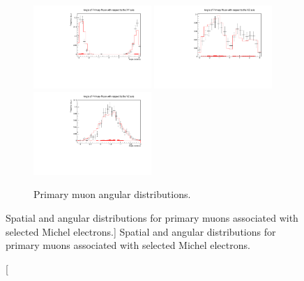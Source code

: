 \begin{figure}
	\begin{subfigure}[b]{\textwidth}
		\centering
		\vspace{1cm}
		\includegraphics[width=0.49\textwidth]{figures/DataVMC_angle_xy.pdf}
		\hfill
		\includegraphics[width=0.49\textwidth]{figures/DataVMC_angle_xz.pdf}
		\includegraphics[width=0.49\textwidth]{figures/DataVMC_angle_yz.pdf}
		\caption {Primary muon angular distributions.}
		\label{fig:muon_angles}
	\end{subfigure}
	

	\caption
	[Spatial and angular distributions for primary muons associated with selected
	Michel electrons.]
	{Spatial and angular distributions for primary muons associated with selected
	Michel electrons.}

	\label{fig:muon_distributions}

\end{figure}

